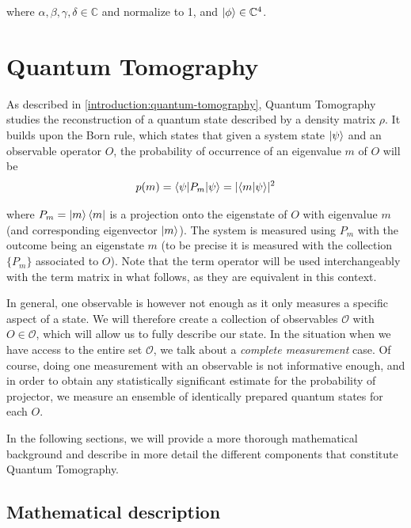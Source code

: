 \documentclass[12pt]{memoir}
\newcommand{\ti}{\textit}
\begin{document}
where $\alpha,\beta,\gamma,\delta \in \mathbb C$ and normalize to 1, and $\ket{\phi} \in \mathbb{C}^4$.\medbreak


\section{Quantum Tomography}\label{section:quantum-tomography}

As described in \ref{introduction:quantum-tomography}, Quantum Tomography studies the reconstruction of a quantum state described by a density matrix $\rho$. It builds upon the Born rule, which states that given a system state $\ket \psi$ and an observable operator $O$, the probability of occurrence of an eigenvalue $m$ of $O$ will be
\begin{equation}
    p(m) = \braket{\psi | P_m| \psi} = \lvert\braket{m|\psi}\rvert^2
\end{equation}

where $P_m = \ket m \bra m$ is a projection onto the eigenstate of $O$ with eigenvalue $m$ (and corresponding eigenvector $\ket m$). The system is measured using $P_m$ with the outcome being an eigenstate $m$ (to be precise it is measured with the collection $\{P_m\}$ associated to $O$). Note that the term operator will be used interchangeably with the term matrix in what follows, as they are equivalent in this context.\medbreak


In general, one observable is however not enough as it only measures a specific aspect of a state. We will therefore create a collection of observables $\mathcal{O}$ with $O \in \mathcal{O}$, which will allow us to fully describe our state. In the situation when we have access to the entire set $\mathcal{O}$, we talk about a \ti{complete measurement} case. Of course, doing one measurement with an observable is not informative enough, and in order to obtain any statistically significant estimate for the probability of projector, we measure an ensemble of identically prepared quantum states for each $O$. \medbreak


In the following sections, we will provide a more thorough mathematical background and describe in more detail the different components that constitute Quantum Tomography.

\subsection{Mathematical description} \label{background:Quantum Tomography:math}
\end{document}
